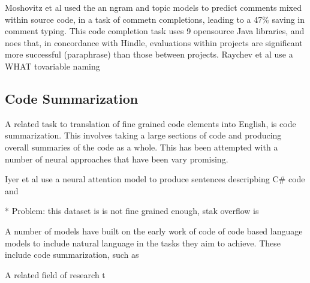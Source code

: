 Moshovitz et al used the an ngram and topic models to predict comments mixed within source code, in a task of commetn completions, leading to a 47\% saving in comment typing. 
This code completion task uses 9 opensource Java libraries, and noes that, in concordance with Hindle, evaluations within projects are significant more successful (paraphrase) than those between projects.
Raychev et al use a WHAT tovariable naming 

\subsection{Code Summarization}

A related task to translation of fine grained code elements into English, is code summarization. This involves taking a large sections of code and producing overall summaries of the code as a whole.
This has been attempted with a number of neural approaches that have been vary promising.

Iyer et al use a neural attention model to produce sentences descripbing C\# code and \cite{iyer_summarizing_2016} 

* Problem: this dataset is is not fine grained enough,  stak overflow is 



 



A number of models have built on the early work of code of code based language models to include natural language in the tasks they aim to achieve. 
These include code summarization, such as 






A related field of research t


